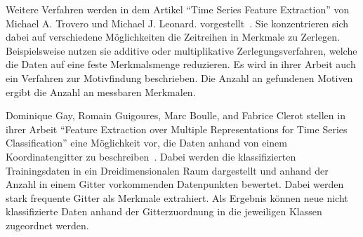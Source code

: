 Weitere Verfahren werden in dem Artikel \enquote{Time Series Feature Extraction} von Michael A. Trovero und Michael J. Leonard. vorgestellt~\cite{Leonard2018}. 
Sie konzentrieren sich dabei auf verschiedene Möglichkeiten die Zeitreihen in Merkmale zu Zerlegen.
Beispielsweise nutzen sie additive oder multiplikative Zerlegungsverfahren, welche die Daten auf eine feste Merkmalsmenge reduzieren.
Es wird in ihrer Arbeit auch ein Verfahren zur Motivfindung beschrieben. Die Anzahl an gefundenen Motiven ergibt die Anzahl an messbaren Merkmalen.

Dominique Gay, Romain Guigoures, Marc Boulle, and Fabrice Clerot stellen in ihrer Arbeit \enquote{Feature Extraction over Multiple Representations for Time Series Classification} eine Möglichkeit vor, die Daten anhand von einem Koordinatengitter zu beschreiben~\cite{Gay2013}.
Dabei werden die klassifizierten Trainingsdaten in ein Dreidimensionalen Raum dargestellt und anhand der Anzahl in einem Gitter vorkommenden Datenpunkten bewertet.
Dabei werden stark frequente Gitter als Merkmale extrahiert. 
Als Ergebnis können neue nicht klassifizierte Daten anhand der Gitterzuordnung in die jeweiligen Klassen zugeordnet werden. 